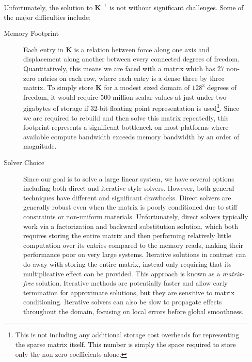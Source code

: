 Unfortunately, the solution to $\mathbf K^{-1}$ is not without
significant challenges. Some of the major difficulties include:
\begin{description}
\item [Memory Footprint] Each entry in $\mathbf K$ is a relation
  between force along one axis and displacement along another between
  every connected degrees of freedom. Quantitatively, this means we
  are faced with a matrix which has 27 non-zero entries on each row,
  where each entry is a dense three by three matrix. To simply store
  $\mathbf K$ for a modest sized domain of $128^3$ degrees of freedom,
  it would require 500 million scalar values at just under two
  gigabytes of storage if 32-bit floating point representation is
  used\footnote{This is not including any additional storage cost
    overheads for representing the sparse matrix itself. This number
    is simply the space required to store only the non-zero
    coefficients alone.}. Since we are required to rebuild and then
  solve this matrix repeatedly, this footprint represents a
  significant bottleneck on most platforms where available compute
  bandwidth exceeds memory bandwidth by an order of magnitude.

  \item [Solver Choice] Since our goal is to solve a large linear
    system, we have several options including both direct and
    iterative style solvers. However, both general techniques have
    different and significant drawbacks. Direct solvers are generally
    robust even when the matrix is poorly conditioned due to stiff
    constraints or non-uniform materials. Unfortunately, direct
    solvers typically work via a factorization and backward
    substitution solution, which both requires storing the entire
    matrix and then performing relatively little computation over its
    entries compared to the memory reads, making their performance
    poor on very large systems. Iterative solutions in contrast can do
    away with storing the entire matrix, instead only requiring that its
    multiplicative effect can be provided. This approach is known as
    a \textit{matrix-free} solution. Iterative methods are potentially faster
    and allow early termination for approximate solutions, but they
    are sensitive to matrix conditioning. Iterative solvers can also
    be slow to propagate effects throughout the domain, focusing on
    local errors before global smoothness.


\end{description}
